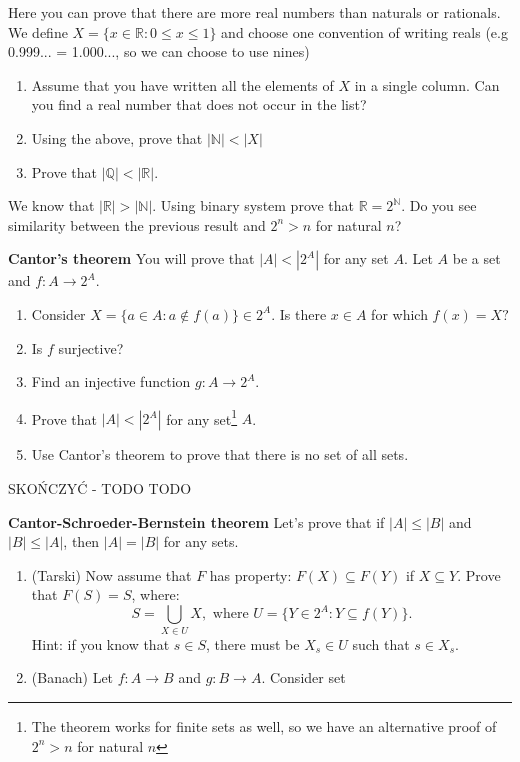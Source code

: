 \begin{prob}
	Here you can prove that there are more real numbers than naturals or rationals. We define $X=\{x\in \mathbb R : 0\le x\le 1\}$ and choose one
	 convention of writing reals (e.g 0.999... = 1.000..., so we can choose to use nines)   
	\begin{enumerate}
		\item Assume that you have written all the elements of $X$ in a single column. Can you find a real number that does not occur in the list? 
		\item Using the above, prove that $|\mathbb N| < |X|$
		\item Prove that $|\mathbb Q| < |\mathbb R|.$
	\end{enumerate}
\end{prob}

\begin{prob}
	We know that $|\mathbb R| > |\mathbb N|.$ Using binary system prove that $\mathbb R=2^\mathbb N.$ Do you see similarity between the previous result
	and $2^n > n$ for natural $n$?
\end{prob}

\begin{prob}
	\textbf{Cantor's theorem} You will prove that $|A|<\left|2^A\right|$ for any set $A$. Let $A$ be a set and $f:A\to 2^A.$
	\begin{enumerate}
		\item Consider $X=\{a\in A : a\notin f(a)\}\in 2^A$. Is there $x\in A$ for which $f(x)=X?$
		\item Is $f$ surjective? 
		\item Find an injective function $g: A\to 2^A.$
		\item Prove that $|A| < |2^A|$ for any set\footnote{The theorem works for finite sets as well, so we have an alternative proof of
			$2^n>n$ for natural $n$} $A$.
		\item Use Cantor's theorem to prove that there is no set of all sets.
	\end{enumerate}
\end{prob}

SKOŃCZYĆ - TODO TODO

\begin{prob}
	\textbf{Cantor-Schroeder-Bernstein theorem} Let's prove that if $|A|\le|B|$ and $|B|\le |A|$, then $|A|=|B|$ for any sets.
	\begin{enumerate}
		\item (Tarski) Now assume that $F$ has property: $F(X)\subseteq F(Y)$ if $X\subseteq Y$. Prove that $F(S)=S$, where:
			$$S=\bigcup_{X\in U} X, \text{~where~} U= \{Y\in 2^A : Y\subseteq f(Y)\}.$$
			Hint: if you know that $s\in S$, there must be $X_s\in U$ such that $s\in X_s.$
		\item (Banach) Let $f: A\to B$ and $g:B\to A$. Consider set
	\end{enumerate}
\end{prob}

